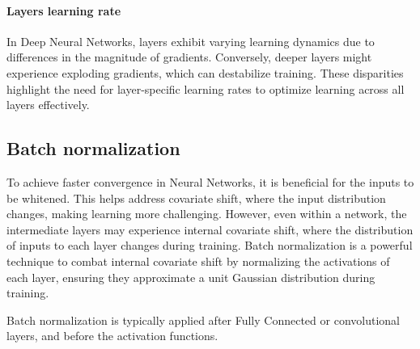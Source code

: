\paragraph*{Layers learning rate}
In Deep Neural Networks, layers exhibit varying learning dynamics due to differences in the magnitude of gradients. 
Conversely, deeper layers might experience exploding gradients, which can destabilize training. 
These disparities highlight the need for layer-specific learning rates to optimize learning across all layers effectively.

\subsection{Batch normalization}
To achieve faster convergence in Neural Networks, it is beneficial for the inputs to be whitened. 
This helps address covariate shift, where the input distribution changes, making learning more challenging.
However, even within a network, the intermediate layers may experience internal covariate shift, where the distribution of inputs to each layer changes during training.
\noindent Batch normalization is a powerful technique to combat internal covariate shift by normalizing the activations of each layer, ensuring they approximate a unit Gaussian distribution during training.

Batch normalization is typically applied after Fully Connected or convolutional layers, and before the activation functions.

